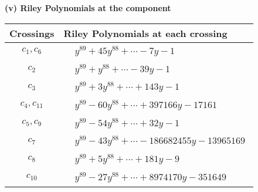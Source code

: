 \documentclass[1p]{elsarticle_modified}
\theoremstyle{definition}
\begin{document}
\newpage\renewcommand{\arraystretch}{1}
\flushleft \textbf{(v) Riley Polynomials at the component}\newline \\
\begin{tabular}{m{50pt}|m{274pt}}
Crossings & \hspace{64pt}Riley Polynomials at each crossing \\
\hline $$\begin{aligned}c_{1},c_{6}\end{aligned}$$&$\begin{aligned}
&y^{89}+45 y^{88}+\cdots-7 y-1
\end{aligned}$\\
\hline $$\begin{aligned}c_{2}\end{aligned}$$&$\begin{aligned}
&y^{89}+y^{88}+\cdots-39 y-1
\end{aligned}$\\
\hline $$\begin{aligned}c_{3}\end{aligned}$$&$\begin{aligned}
&y^{89}+3 y^{88}+\cdots+143 y-1
\end{aligned}$\\
\hline $$\begin{aligned}c_{4},c_{11}\end{aligned}$$&$\begin{aligned}
&y^{89}-60 y^{88}+\cdots+397166 y-17161
\end{aligned}$\\
\hline $$\begin{aligned}c_{5},c_{9}\end{aligned}$$&$\begin{aligned}
&y^{89}-54 y^{88}+\cdots+32 y-1
\end{aligned}$\\
\hline $$\begin{aligned}c_{7}\end{aligned}$$&$\begin{aligned}
&y^{89}-43 y^{88}+\cdots-186682455 y-13965169
\end{aligned}$\\
\hline $$\begin{aligned}c_{8}\end{aligned}$$&$\begin{aligned}
&y^{89}+5 y^{88}+\cdots+181 y-9
\end{aligned}$\\
\hline $$\begin{aligned}c_{10}\end{aligned}$$&$\begin{aligned}
&y^{89}-27 y^{88}+\cdots+8974170 y-351649
\end{aligned}$\\
\hline
\end{tabular}\\~\\
\end{document}
